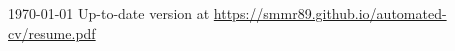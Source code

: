 \documentclass[11pt, a4paper]{awesome-cv}
\begin{document}
\makecvheader[C]

\makecvfooter
{\today}
{Up-to-date version at \upshape\color{text}\url{https://smmr89.github.io/automated-cv/resume.pdf}}
{\thepage}



\medskip
\vspace{1em}

\vspace{-1em}

\medskip

\end{document}
